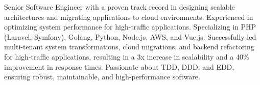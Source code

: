 

\begin{cvparagraph}
Senior Software Engineer with a proven track record in designing scalable architectures and migrating applications to cloud environments. Experienced in optimizing system performance for high-traffic applications. Specializing in PHP (Laravel, Symfony), Golang, Python, Node.js, AWS, and Vue.js. Successfully led multi-tenant system transformations, cloud migrations, and backend refactoring for high-traffic applications, resulting in a 3x increase in scalability and a 40\% improvement in response times. Passionate about TDD, DDD, and EDD, ensuring robust, maintainable, and high-performance software.
\end{cvparagraph}
